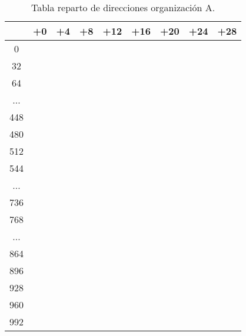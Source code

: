 \begin{table}[H]
    \centering
    \begin{tabular}{|c|c|c|c|c|c|c|c|c|}
        \hline
       	&+0 &+4&+8&+12&+16&+20&+24&+28\\\hline
	0&\multicolumn{8}{c}{\cellcolor{azul}{ }}\\
	32&\multicolumn{8}{c}{\cellcolor{azul}{ }}\\
	64&\multicolumn{8}{c}{\cellcolor{azul}{}} \\
	...&\multicolumn{8}{c}{\cellcolor{azul}{LAN1.0}}\\
	448&\multicolumn{8}{c}{\cellcolor{azul}{ }}\\
	480&\multicolumn{8}{c}{\cellcolor{azul}{ }}\\ \hline 
	512&\multicolumn{8}{c}{\cellcolor{lila}{ }}\\
	544&\multicolumn{8}{c}{\cellcolor{lila}{ }}\\
	...&\multicolumn{8}{c}{\cellcolor{lila}{LAN1.2}} \\
	736&\multicolumn{8}{c}{\cellcolor{lila}{ }} \\ \hline
	768&\multicolumn{8}{c}{\cellcolor{rosa}{ }}  \\ 
	...&\multicolumn{8}{c}{\cellcolor{rosa}{LAN1.3}}  \\
	864&\multicolumn{8}{c}{\cellcolor{rosa}{ }}  \\ \hline
	896&\multicolumn{8}{c}{\cellcolor{naranja}{ LAN1.1}} \\
	928&\multicolumn{8}{c}{\cellcolor{naranja}{ }} \\ \hline
	960&\cellcolor{verde}{P2P1.0} &\cellcolor{verde}{P2P1.1} &\cellcolor{verde}{P2P1.2} &\cellcolor{verde}{P2P1.3} &\cellcolor{verde}{P2P1.4} &\cellcolor{verde}{P2P1.5} &\cellcolor{verde}{P2P1.6} &\\ \hline
	992&&&&&&&& \\ \hline
    \end{tabular}
    \caption{Tabla reparto de direcciones organización A.}
    \label{tab:orgA.2}
\end{table}


